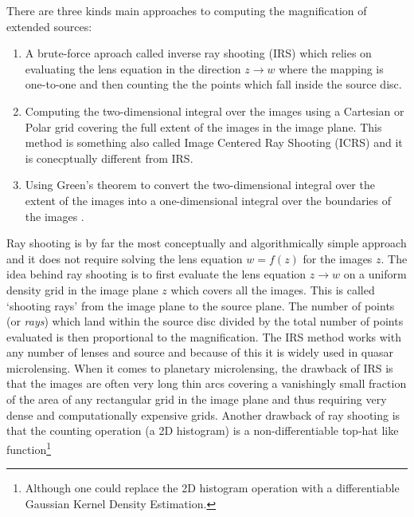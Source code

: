 \documentclass[12pt,dvipsnames]{report}
\newcommand{\ssf}[1]{\textsf{#1}}
\begin{document}
There are three kinds main approaches to computing the magnification of
extended sources:
\begin{enumerate}
    \item A brute-force aproach called \textsf{inverse ray shooting} (IRS)
          \citep{1986A&A...166...36K,1997MNRAS.284..172W} which relies on evaluating the
          lens equation in the direction $z\rightarrow w$ where the mapping is one-to-one
          and then counting the the points which fall inside the source disc.
    \item Computing the two-dimensional integral over the images using a Cartesian or
          Polar grid covering the full extent of the images in the image plane. This
          method is something also called \ssf{Image Centered Ray Shooting} (ICRS)
          \citep{1996ApJ...472..660B,2010ApJ...716.1408B} and it is conecptually
          different from IRS.
    \item  Using \textsf{Green's theorem} to convert the two-dimensional integral over the
          extent of the images into a one-dimensional integral over the boundaries of the
          images
          \citep{1986A&A...166...36K,1995A&AS..109..597D,1997ApJ...477..580G,1998A&A...333L..79D,2007MNRAS.377.1679D}.
\end{enumerate}
Ray shooting is by far the most conceptually and algorithmically simple approach and
it does not require solving the lens equation $w=f(z)$ for the images $z$. The
idea behind ray shooting is to first evaluate the lens equation $z \rightarrow w$ on
a uniform density grid in the image plane $z$ which covers all the images. This
is called `shooting rays' from the image plane to the source plane.
The number of points (or \emph{rays}) which land within the source disc
divided by the total number of points evaluated is then proportional to the
magnification. The IRS method works with any number of lenses and source and
because of this it is widely used in quasar microlensing.
When it comes to planetary microlensing, the drawback of IRS is that the images
are often very long thin arcs covering a vanishingly small fraction of the area of
any rectangular grid in the image plane and thus requiring very dense and
computationally expensive grids. Another drawback of ray shooting is that
the counting operation (a 2D histogram) is a non-differentiable top-hat like
function\footnote{Although one could replace the 2D histogram operation with a differentiable \ssf{Gaussian Kernel Density Estimation}.}
\end{document}
